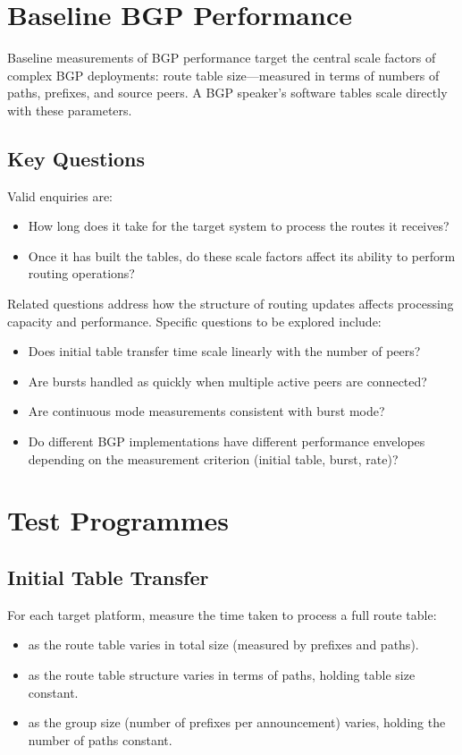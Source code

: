 
\section{Baseline BGP Performance}

Baseline measurements of BGP performance target the central scale factors of complex BGP deployments: route table size---measured in terms of numbers of paths, prefixes, and source peers. A BGP speaker's software tables scale directly with these parameters.

\subsection{Key Questions}

Valid enquiries are:
\begin{itemize}
    \item How long does it take for the target system to process the routes it receives?
    \item Once it has built the tables, do these scale factors affect its ability to perform routing operations?
\end{itemize}

Related questions address how the structure of routing updates affects processing capacity and performance. Specific questions to be explored include:
\begin{itemize}
    \item Does initial table transfer time scale linearly with the number of peers?
    \item Are bursts handled as quickly when multiple active peers are connected?
    \item Are continuous mode measurements consistent with burst mode?
    \item Do different BGP implementations have different performance envelopes depending on the measurement criterion (initial table, burst, rate)?
\end{itemize}

\section{Test Programmes}

\subsection{Initial Table Transfer}
For each target platform, measure the time taken to process a full route table:
\begin{itemize}
    \item as the route table varies in total size (measured by prefixes and paths).
    \item as the route table structure varies in terms of paths, holding table size constant.
    \item as the group size (number of prefixes per announcement) varies, holding the number of paths constant.
\end{itemize}

